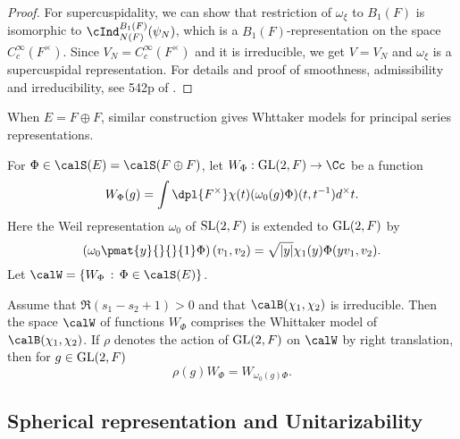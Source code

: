 \begin{proof}
For supercuspidality, we can show that restriction of $\omega_{\xi}$ to $B_{1}(F)$ is isomorphic to $\cInd_{N(F)}^{B_{1}(F)}(\psi_{N})$, which is a $B_{1}(F)$-representation on the space $C_{c}^{\infty}(F^{\times})$. Since $V_N = C_{c}^{\infty}(F^{\times})$ and it is irreducible, we get $V = V_N$ and $\omega_{\xi}$ is a supercuspidal representation. 
For details and proof of smoothness, admissibility and irreducibility, see 542p of \cite{bu}. 
\end{proof}
When $E = F\oplus F$, similar construction gives Whttaker models for principal series representations. 
\begin{definition}
For $\Phi\in\calS(E) = \calS(F\oplus F)$, let $W_{\Phi}:\GL(2, F)\to \Cc$ be a function
$$
W_{\Phi}(g) = \int\dpl{F^{\times}} \chi(t) (\omega_0(g)\Phi)(t, t^{-1}) d^{\times}t.
$$
Here the Weil representation $\omega_0$ of $\mathrm{SL}(2, F)$ is extended to $\mathrm{GL}(2, F)$ by 
$$
\left(\omega_{0}\pmat{y}{}{}{1}\Phi\right)(v_1, v_2) = \sqrt{|y|}\chi_1(y)\Phi(yv_1, v_2).
$$
Let $\calW = \{W_{\Phi}\,:\, \Phi\in\calS(E)\}$. 
\end{definition}
\begin{proposition}
Assume that $\Re(s_1 - s_2 + 1)>0$ and that $\calB(\chi_1, \chi_2)$ is irreducible. 
Then the space $\calW$ of functions $W_{\Phi}$ comprises the Whittaker model of $\calB(\chi_1, \chi_2)$.
If $\rho$ denotes the action of $\mathrm{GL}(2, F)$ on $\calW$ by right translation, then for $g\in \mathrm{GL}(2, F)$ 
$$
\rho(g)W_{\Phi} = W_{\omega_0(g)\Phi}. 
$$
\end{proposition}

\subsection{Spherical representation and Unitarizability}


